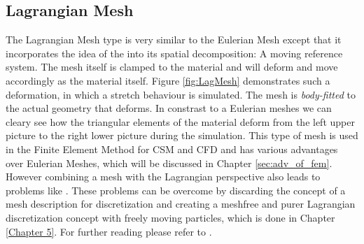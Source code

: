 \subsection{Lagrangian Mesh}

The Lagrangian Mesh type is very similar to the Eulerian Mesh except that it incorporates the idea of the  into its spatial decomposition: A moving reference system. The mesh itself is clamped to the material and will deform and move accordingly as the material itself. Figure \ref{fig:LagMesh}
demonstrates such a deformation, in which a stretch behaviour is simulated. The mesh is \emph{body-fitted} to the actual geometry that deforms. In constrast to a Eulerian meshes we can cleary see how the triangular elements of the material deform from the left upper picture to the right lower picture during the simulation. This type of mesh is used in the Finite Element Method for CSM and CFD and has various
advantages over Eulerian Meshes, which will be discussed in Chapter \ref{sec:adv_of_fem}. However combining a mesh with the Lagrangian perspective also leads to problems
like . These problems can be overcome by discarding the concept of a mesh description for discretization and creating a meshfree and purer Lagrangian discretization concept with freely moving particles, which is done in Chapter \ref{Chapter 5}. For further reading please refer to \citep{Bennett2006}.



